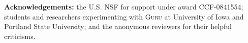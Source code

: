 \documentclass[9pt,natbib]{sigplanconf}
\begin{document}
\textbf{Acknowledgements:} the U.S. NSF for support under award
CCF-0841554; students and researchers experimenting with \textsc{Guru}
at University of Iowa and Portland State University; and the anonymous
reviewers for their helpful criticisms.




\end{document}
